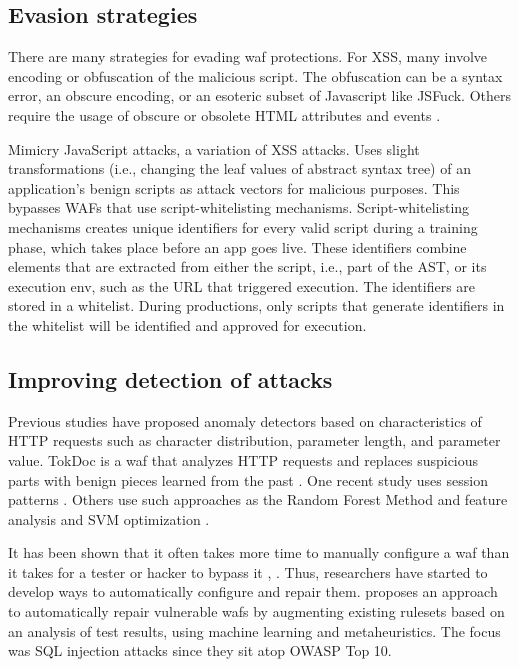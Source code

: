\subsection{Evasion strategies}
There are many strategies for evading \acrshort{waf} protections. For XSS, many involve encoding or obfuscation of the malicious script. The obfuscation can be a syntax error, an obscure encoding, or an esoteric subset of Javascript like JSFuck. Others require the usage of obscure or obsolete HTML attributes and events \cite{owasp_bypass_techniques}.

Mimicry JavaScript attacks, a variation of XSS attacks. Uses slight transformations (i.e., changing the leaf values of abstract syntax tree) of an application’s benign scripts as attack vectors for malicious purposes. This bypasses WAFs that use script-whitelisting mechanisms. Script-whitelisting mechanisms creates unique identifiers for every valid script during a training phase, which takes place before an app goes live. These identifiers combine elements that are extracted from either the script, i.e., part of the AST, or its execution env, such as the URL that triggered execution. The identifiers are stored in a whitelist. During productions, only scripts that generate identifiers in the whitelist will be identified and approved for execution. \cite{chaliasos2019mime}

\subsection{Improving detection of attacks}
Previous studies have proposed anomaly detectors based on characteristics of HTTP requests such as character distribution, parameter length, and parameter value. TokDoc is a \acrshort{waf} that analyzes HTTP requests and replaces suspicious parts with benign pieces learned from the past \cite{krueger2010tokdoc}. One recent study uses session patterns \cite{tanriverdi2019implementation}. Others use such approaches as the Random Forest Method \cite{thang2020improving} and feature analysis and SVM optimization \cite{liu2020web}. 

It has been shown that it often takes more time to manually configure a \acrshort{waf} than it takes for a tester or hacker to bypass it \cite{virtualpatching}, \cite{virtualpatching_survey}. Thus, researchers have started to develop ways to automatically configure and repair them. \cite{appelt2017automatically} proposes an approach to automatically repair vulnerable \acrshort{waf}s by augmenting existing rulesets based on an analysis of test results, using machine learning and metaheuristics. The focus was SQL injection attacks since they sit atop OWASP Top 10.

